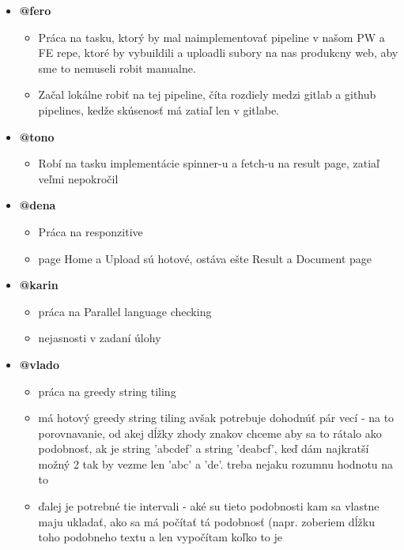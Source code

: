 \documentclass{article}
\begin{document}
    \begin{itemize}
        \item \textbf {@fero}
        \begin{itemize}
            \item Práca na tasku, ktorý by mal naimplementovať pipeline v našom PW a FE repe, ktoré by vybuildili a uploadli subory na nas produkcny web, aby sme to nemuseli robit manualne.
            \item Začal lokálne robiť na tej pipeline, číta rozdiely medzi gitlab a github pipelines, kedže skúsenosť má zatiaľ len v gitlabe.
        \end{itemize}
        \item \textbf {@tono}
        \begin{itemize}
            \item Robí na tasku implementácie spinner-u a fetch-u na result page, zatiaľ veľmi nepokročil
        \end{itemize}
        \item \textbf {@dena}
        \begin{itemize}
            \item Práca na responzitive
            \item page Home a Upload sú hotové, ostáva ešte Result a Document page
        \end{itemize}
        \item \textbf {@karin}
        \begin{itemize}
            \item práca na Parallel language checking
            \item nejasnosti v zadaní úlohy
        \end{itemize}
        \item \textbf {@vlado}
        \begin{itemize}
            \item práca na greedy string tiling
            \item má hotový greedy string tiling avšak potrebuje dohodnúť pár vecí - na to porovnavanie, od akej dĺžky zhody znakov chceme aby sa to rátalo ako podobnosť, ak je string 'abcdef' a string 'deabcf', keď dám najkratší možný 2 tak by vezme len 'abc' a 'de'. treba nejaku rozumnu hodnotu na to
            \item ďalej je potrebné tie intervali - aké su tieto podobnosti kam sa vlastne maju ukladať, ako sa má počítať tá podobnosť (napr. zoberiem dĺžku toho podobneho textu a len vypočítam koľko to je %

\end{itemize}
\end{itemize}
\end{document}
